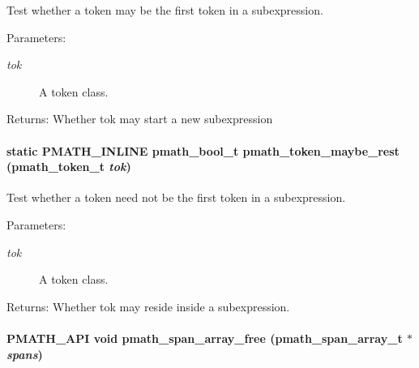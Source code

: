 Test whether a token may be the first token in a subexpression. 

\begin{Desc}
\item[Parameters:]
\begin{description}
\item[{\em tok}]A token class. \end{description}
\end{Desc}
\begin{Desc}
\item[Returns:]Whether tok may start a new subexpression \end{Desc}
\hypertarget{group__parser_g8e0466acaa70f215fa799cc547eadac4}{
\paragraph[{pmath\_\-token\_\-maybe\_\-rest}]{\setlength{\rightskip}{0pt plus 5cm}static PMATH\_\-INLINE {\bf pmath\_\-bool\_\-t} pmath\_\-token\_\-maybe\_\-rest ({\bf pmath\_\-token\_\-t} {\em tok})}\hfill}
\label{group__parser_g8e0466acaa70f215fa799cc547eadac4}


Test whether a token need not be the first token in a subexpression. 

\begin{Desc}
\item[Parameters:]
\begin{description}
\item[{\em tok}]A token class. \end{description}
\end{Desc}
\begin{Desc}
\item[Returns:]Whether tok may reside inside a subexpression. \end{Desc}
\hypertarget{group__parser_gceb05ef4c39c239d68f39e3b9bde5f1e}{
\paragraph[{pmath\_\-span\_\-array\_\-free}]{\setlength{\rightskip}{0pt plus 5cm}PMATH\_\-API void pmath\_\-span\_\-array\_\-free ({\bf pmath\_\-span\_\-array\_\-t} $\ast$ {\em spans})}\hfill}
\label{group__parser_gceb05ef4c39c239d68f39e3b9bde5f1e}


